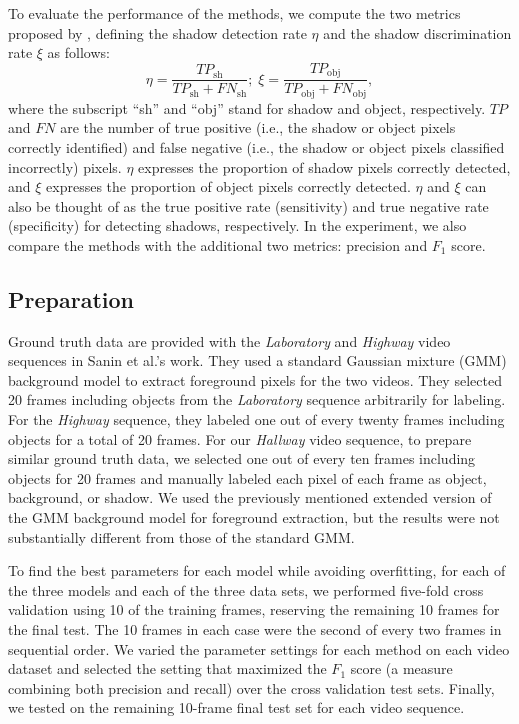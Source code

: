 To evaluate the performance of the methods, we compute the two metrics
proposed by , defining the shadow detection
rate $\eta$ and the shadow discrimination rate $\xi$ as follows:
\[
  \eta = \frac{TP_{\text{sh}}}{TP_{\text{sh}} + FN_{\text{sh}}};\; 
  \xi = \frac{TP_{\text{obj}}}{TP_{\text{obj}} + FN_{\text{obj}}},
\]
where the subscript ``sh'' and ``obj'' stand for shadow and object,
respectively. $TP$ and $FN$ are the number of true positive (i.e., the
shadow or object pixels correctly identified) and false negative
(i.e., the shadow or object pixels classified incorrectly) pixels.
$\eta$ expresses the proportion of shadow pixels correctly detected,
and $\xi$ expresses the proportion of object pixels correctly
detected.  $\eta$ and $\xi$ can also be thought of as the true
positive rate (sensitivity) and true negative rate (specificity) for
detecting shadows, respectively. In the experiment, we also compare
the methods with the additional two metrics: precision and $F_1$
score.

\subsection{Preparation}

Ground truth data are provided with the \textit{Laboratory} and
\textit{Highway} video sequences in Sanin et al.'s work\nocite{sanin12shadow}. 
They used a standard Gaussian mixture (GMM) background
model\nocite{stauffer99background} to extract foreground pixels for
the two videos. They selected 20 frames including objects from
the \textit{Laboratory} sequence arbitrarily for labeling.  For
the \textit{Highway} sequence, they labeled one out of every twenty
frames including objects for a total of 20 frames.  For our
\textit{Hallway} video sequence, to prepare similar ground truth data,
we selected one out of every ten frames including objects for 20
frames and manually labeled each pixel of each frame as object,
background, or shadow. We used the previously mentioned extended
version of the GMM background model for foreground extraction, but the
results were not substantially different from those of the standard
GMM.

To find the best parameters for each model while avoiding overfitting,
for each of the three models and each of the three data sets, we
performed five-fold cross validation using 10 of the training frames,
reserving the remaining 10 frames for the final test. The 10 frames in
each case were the second of every two frames in sequential order. We
varied the parameter settings for each method on each video dataset
and selected the setting that maximized the $F_1$ score (a measure
combining both precision and recall) over the cross validation test
sets. Finally, we tested on the remaining 10-frame final test set for
each video sequence.

